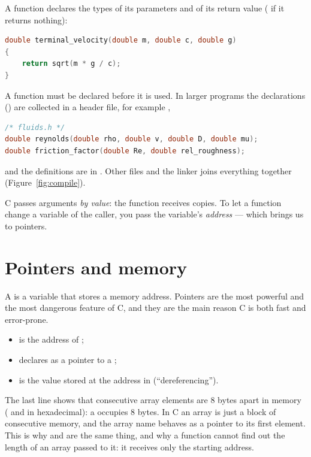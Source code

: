 A function declares the types of its parameters and of its return value
( if it returns nothing):
\begin{lstlisting}[language=C]
double terminal_velocity(double m, double c, double g)
{
    return sqrt(m * g / c);
}
\end{lstlisting}
A function must be declared before it is used. In larger programs the declarations
() are collected in a header file, for example ,
\begin{lstlisting}[language=C]
/* fluids.h */
double reynolds(double rho, double v, double D, double mu);
double friction_factor(double Re, double rel_roughness);
\end{lstlisting}
and the definitions are in . Other files  and
the linker joins everything together (Figure~\ref{fig:compile}).

C passes arguments \emph{by value}: the function receives copies. To let a function
change a variable of the caller, you pass the variable's \emph{address} --- which brings us
to pointers.

\section{Pointers and memory}

A  is a variable that stores a memory address. Pointers are the most
powerful and the most dangerous feature of C, and they are the main reason C is both fast
and error-prone.
\begin{itemize}
\item {} is the address of ;
\item {} declares  as a pointer to a ;
\item {} is the value stored at the address in  (``dereferencing'').
\end{itemize}
The last line shows that consecutive array elements are 8 bytes apart in memory (
and  in hexadecimal): a  occupies 8 bytes. In C an array is just a
block of consecutive memory, and the array name behaves as a pointer to its first element.
This is why  and  are the same thing, and why a function cannot
find out the length of an array passed to it: it receives only the starting address.

